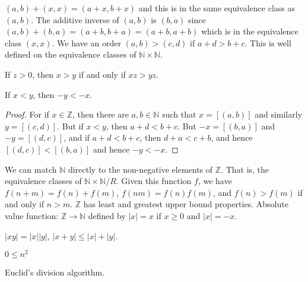 \documentclass{article}                                                        %
\begin{document}
            $(a,b)+(x,x)=(a+x,b+x)$ and this is in the same equivalence class as
            $(a,b)$. The additive inverse of $(a,b)$ is $(b,a)$ since
            $(a,b)+(b,a)=(a+b,b+a)=(a+b,a+b)$ which is in the equivalence class
            $(x,x)$. We have an order $(a,b)>(c,d)$ if $a+d>b+c$. This is well
            defined on the equivalence classes of $\mathbb{N}\times\mathbb{N}$.
            \begin{theorem}
                If $z>0$, then $x>y$ if and only if $xz>yz$.
            \end{theorem}
            \begin{theorem}
                If $x<y$, then $\minus{y}<\minus{x}$.
            \end{theorem}
            \begin{proof}
                For if $x\in\mathbb{Z}$, then there are $a,b\in\mathbb{N}$ such
                that $x=[(a,b)]$ and similarly $y=[(c,d)]$. But if
                $x<y$, then $a+d<b+c$. But $\minus{x}=[(b,a)]$ and
                $\minus{y}=[(d,c)]$, and if $a+d<b+c$, then $d+a<c+b$, and hence
                $[(d,c)]<[(b,a)]$ and hence $\minus{y}<\minus{x}$.
            \end{proof}
            We can match $\mathbb{N}$ directly to the non-negative elements of
            $\mathbb{Z}$. That is, the equivalence classes of
            $\mathbb{N}\times\mathbb{N}/R$. Given this function $f$, we have
            $f(n+m)=f(n)+f(m)$, $f(nm)=f(n)f(m)$, and $f(n)>f(m)$ if and only if
            $n>m$. $\mathbb{Z}$ has least and greatest upper bound properties.
            Absolute value function: $\mathbb{Z}\rightarrow\mathbb{N}$ defined
            by $|x|=x$ if $x\geq{0}$ and $|x|=\minus{x}$.
            \begin{theorem}
                $|xy|=|x||y|$, $|x+y|\leq|x|+|y|$.
            \end{theorem}
            \begin{theorem}
                $0\leq{n}^{2}$
            \end{theorem}
            Euclid's division algorithm.
\end{document}
